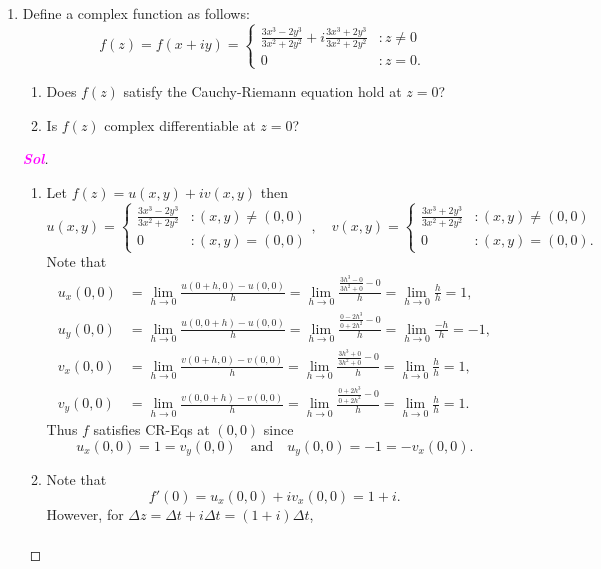 \documentclass{article}
\theoremstyle{definition}
\newcommand{\of}[1]{\left( #1 \right)}
\newcommand{\sol}{\textcolor{magenta}{\bf Sol}}
\begin{document}
\begin{enumerate}
		\newpage
		\item Define a complex function as follows: \[
		f\of{z}=f\of{x+iy}=\begin{cases}
		\displaystyle\frac{3x^3-2y^3}{3x^2+2y^2}+i\frac{3x^3+2y^3}{3x^2+2y^2} &: z\neq 0\\
		0 &: z=0.
		\end{cases}
		\] \begin{enumerate}
			\item Does $f(z)$ satisfy the Cauchy-Riemann equation hold at $z=0$?
			\item Is $f(z)$ complex differentiable at $z=0$?
		\end{enumerate}
		\begin{proof}[\sol]
			\begin{enumerate}
				\item Let $f\of{z}=u(x,y)+iv(x,y)$ then \[
				u(x,y)=\begin{cases}\displaystyle
				\frac{3x^3-2y^3}{3x^2+2y^2}&: (x,y)\neq (0,0)\\
				0 &: (x,y)=(0,0)
				\end{cases},\quad
				v(x,y)=\begin{cases}\displaystyle
				\frac{3x^3+2y^3}{3x^2+2y^2} &: (x,y)\neq (0,0)\\
				0 &: (x,y)=(0,0).
				\end{cases}
				\] Note that \begin{align*}
				u_x(0,0)&=\lim\limits_{h\to 0}\frac{u(0+h,0)-u(0,0)}{h}=\lim\limits_{h\to 0}\frac{\frac{3h^3-0}{3h^2+0}-0}{h}=\lim\limits_{h\to 0}\frac{h}{h}=1,\\
				u_y(0,0)&=\lim\limits_{h\to 0}\frac{u(0,0+h)-u(0,0)}{h}=\lim\limits_{h\to 0}\frac{\frac{0-2h^3}{0+2h^2}-0}{h}=\lim\limits_{h\to 0}\frac{-h}{h}=-1,\\
				v_x(0,0)&=\lim\limits_{h\to 0}\frac{v(0+h,0)-v(0,0)}{h}=\lim\limits_{h\to 0}\frac{\frac{3h^3+0}{3h^2+0}-0}{h}=\lim\limits_{h\to 0}\frac{h}{h}=1,\\
				v_y(0,0)&=\lim\limits_{h\to 0}\frac{v(0,0+h)-v(0,0)}{h}=\lim\limits_{h\to 0}\frac{\frac{0+2h^3}{0+2h^2}-0}{h}=\lim\limits_{h\to 0}\frac{h}{h}=1.
				\end{align*}
				Thus $f$ satisfies CR-Eqs at $(0,0)$ since \[
				u_x(0,0)=1=v_y(0,0)\quad\text{and}\quad u_y(0,0)=-1=-v_x\of{0,0}.
				\]
				\vspace{4pt}
				\item Note that \[
				f'(0)=u_x(0,0)+iv_x(0,0)=1+i.
				\] However, for $\Delta z=\Delta t+i\Delta t=(1+i)\Delta t$, \begin{align*}

\end{align*}
\end{enumerate}
\end{proof}
\end{enumerate}
\end{document}
